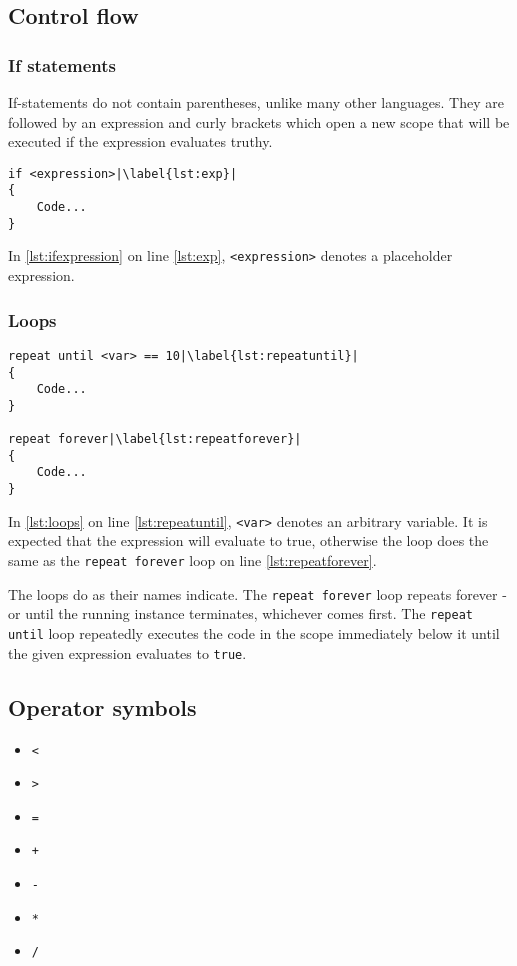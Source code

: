 \subsection{Control flow}
\subsubsection{If statements}
If-statements do not contain parentheses, unlike many other languages. They are followed by an expression and curly brackets which open a new scope that will be executed if the expression evaluates truthy.

\begin{lstlisting}[caption={Example of an if statement}, label={lst:ifexpression},escapechar=|]
if <expression>|\label{lst:exp}|
{
    Code...
}
\end{lstlisting}

In \ref{lst:ifexpression} on line \ref{lst:exp},  \verb|<expression>| denotes a placeholder expression.

\subsubsection{Loops}
\begin{lstlisting}[caption={Example of loops}, label={lst:loops},escapechar=|]
repeat until <var> == 10|\label{lst:repeatuntil}|
{
    Code...
}

repeat forever|\label{lst:repeatforever}|
{
    Code...
}
\end{lstlisting}

In \ref{lst:loops} on line \ref{lst:repeatuntil}, \verb|<var>| denotes an arbitrary variable. It is expected that the expression will evaluate to true, otherwise the loop does the same as the \verb|repeat forever| loop on line \ref{lst:repeatforever}.

The loops do as their names indicate. The \verb|repeat forever| loop repeats forever - or until the running instance terminates, whichever comes first. %
The \verb|repeat until| loop repeatedly executes the code in the scope immediately below it until the given expression evaluates to \verb|true|.

\subsection{Operator symbols}
\begin{multicols}{7}
    \begin{itemize}
        \item \verb|<|
        \item \verb|>|
        \item \verb|=|
        \item \verb|+|
        \item \verb|-|
        \item \verb|*|
        \item \verb|/|
    \end{itemize}
\end{multicols}
